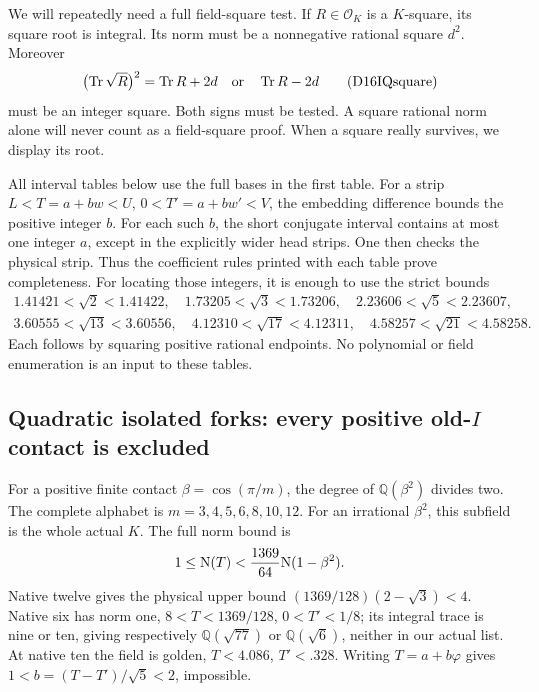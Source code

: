 We will repeatedly need a full
field-square test.
If \(R\in\mathcal O_K\) is a \(K\)-square,
its square root is integral.
Its norm must be a nonnegative
rational square \(d^2\).
Moreover
\[
             \bigl(\operatorname{Tr}\sqrt R\bigr)^2
                 =\operatorname{Tr}R+2d
                    \quad\hbox{or}\quad
                   \operatorname{Tr}R-2d
\tag{D16IQsquare}\label{eq:arithD16Iquadraticsquare}
\]
must be an integer square.
Both signs must be tested.
A square rational norm alone will
never count as a field-square proof.
When a square really survives,
we display its root.

All interval tables below use the
full bases in the first table.
For a strip \(L<T=a+bw<U\),
\(0<T'=a+bw'<V\), the embedding
difference bounds the positive
integer \(b\).
For each such \(b\), the short
conjugate interval contains at most
one integer \(a\), except in the
explicitly wider head strips.
One then checks the physical strip.
Thus the coefficient rules printed
with each table prove completeness.
For locating those integers, it is
enough to use the strict bounds
\[
\begin{gathered}
1.41421<\sqrt2<1.41422,\quad
1.73205<\sqrt3<1.73206,\quad
2.23606<\sqrt5<2.23607,\\
3.60555<\sqrt{13}<3.60556,\quad
4.12310<\sqrt{17}<4.12311,\quad
4.58257<\sqrt{21}<4.58258 .
\end{gathered}
\]
Each follows by squaring positive
rational endpoints.
No polynomial or field enumeration
is an input to these tables.

\subsection{Quadratic isolated forks: every positive old-\(I\) contact is excluded}
\label{app:arithD16Iquadraticcontacts}

For a positive finite contact
\(\beta=\cos(\pi/m)\), the degree
of \(\mathbb Q(\beta^2)\) divides two.
The complete alphabet is
\(m=3,4,5,6,8,10,12\).
For an irrational \(\beta^2\), this
subfield is the whole actual \(K\).
The full norm bound is
\[
             1\le\mathrm N(T)<
                    {1369\over64}\mathrm N(1-\beta^2).
\]
Native twelve gives the physical
upper bound
\((1369/128)(2-\sqrt3)<4\).
Native six has norm one,
\(8<T<1369/128\), \(0<T'<1/8\);
its integral trace is nine or ten,
giving respectively \(\mathbb Q(\sqrt{77})\)
or \(\mathbb Q(\sqrt6)\), neither
in our actual list.
At native ten the field is golden,
\(T<4.086\), \(T'<.328\).
Writing \(T=a+b\varphi\) gives
\(1<b=(T-T')/\sqrt5<2\), impossible.

